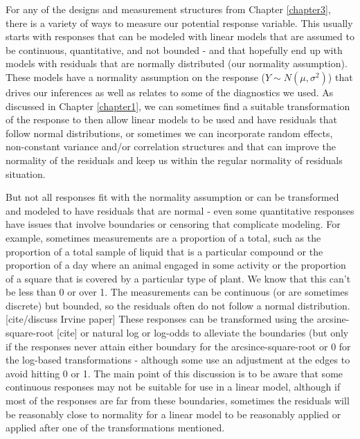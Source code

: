 \documentclass[
]{book}
\begin{document}
For any of the designs and measurement structures from Chapter \ref{chapter3}, there is a variety of ways to measure our potential response variable. This usually starts with responses that can be modeled with linear models that are assumed to be continuous, quantitative, and not bounded - and that hopefully end up with models with residuals that are normally distributed (our normality assumption). These models have a normality assumption on the response (\(Y \sim N(\mu, \sigma^2)\)) that drives our inferences as well as relates to some of the diagnostics we used. As discussed in Chapter \ref{chapter1}, we can sometimes find a suitable transformation of the response to then allow linear models to be used and have residuals that follow normal distributions, or sometimes we can incorporate random effects, non-constant variance and/or correlation structures and that can improve the normality of the residuals and keep us within the regular normality of residuals situation.

But not all responses fit with the normality assumption or can be transformed and modeled to have residuals that are normal - even some quantitative responses have issues that involve boundaries or censoring that complicate modeling. For example, sometimes measurements are a proportion of a total, such as the proportion of a total sample of liquid that is a particular compound or the proportion of a day where an animal engaged in some activity or the proportion of a square that is covered by a particular type of plant. We know that this can't be less than 0 or over 1. The measurements can be continuous (or are sometimes discrete) but bounded, so the residuals often do not follow a normal distribution. {[}cite/discuss Irvine paper{]} These responses can be transformed using the arcsine-square-root {[}cite{]} or natural log or log-odds to alleviate the boundaries (but only if the responses never attain either boundary for the arcsince-square-root or 0 for the log-based transformations - although some use an adjustment at the edges to avoid hitting 0 or 1. The main point of this discussion is to be aware that some continuous responses may not be suitable for use in a linear model, although if most of the responses are far from these boundaries, sometimes the residuals will be reasonably close to normality for a linear model to be reasonably applied or applied after one of the transformations mentioned.
\end{document}

